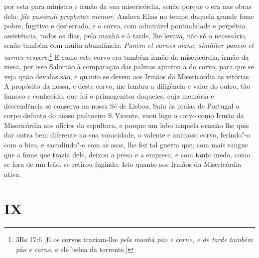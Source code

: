 por esta para ministro e irmão da sua misericórdia, senão porque o era
nas obras dela: \emph{file pascendi prophetae memor.} Andava Elias no
tempo daquela grande fome pobre, fugitivo e desterrado, e o corvo, com
admirável pontualidade e perpétua assistência, todos os dias, pela manhã
e à tarde, lhe levava, não só o necessário, senão também com muita
abundância: \emph{Panem et carnes mane, similiter panem et carnes vespere}.\footnote{3Rs 17:6 [E os corvos traziam-lhe \textit{pela manhã pão e carne, e de tarde também pão e carne}, e ele bebia da torrente.]} E como este corvo
era também irmão da misericórdia, irmão da mesa, por isso Salomão à
comparação das palmas ajuntou a do corvo, para que se veja quão devidas
são, e quanto se devem aos Irmãos da Misericórdia as vitórias. A
propósito da nossa, e deste corvo, me lembra a diligência e valor do
outro, tão famoso e conhecido, que foi o primogenitor daqueles, cuja
memória e descendência se conserva na nossa Sé de Lisboa. Saiu às praias
de Portugal o corpo defunto do nosso padroeiro S.\,Vicente, voou logo o
corvo como Irmão da Misericórdia aos ofícios da sepultura, e porque um
lobo naquela ocasião lhe quis dar outra bem diferente na sua voracidade,
o valente e animoso corvo, ferindo"-o com o bico, e sacudindo"-o com as
asas, lhe fez tal guerra que, com mais sangue que a fome que trazia
dele, deixou a presa e a empresa, e com tanto medo, como se fora de um
leão, se retirou fugindo. Isto quanto aos Irmãos da Misericórdia ativa.

\section*{IX}

